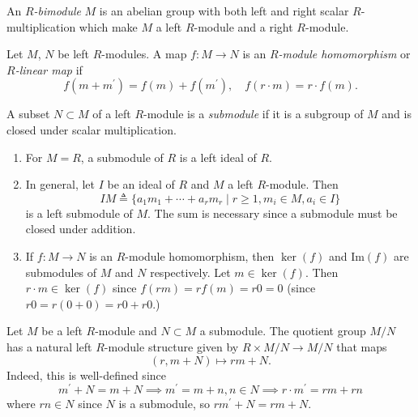 \begin{defn}[Bimodule]
An \emph{$R$-bimodule} $M$ is an abelian group with both left and
right scalar $R$-multiplication which make $M$ a left $R$-module and a
right $R$-module.
\end{defn}

\begin{defn}
Let $M$, $N$ be left $R$-modules. A map
$f : M \to N$ is an \emph{$R$-module homomorphism} or
\emph{$R$-linear map} if
$$
f(m + m^\prime) = f(m) + f(m^\prime), \quad
f(r \cdot m) = r \cdot f(m).
$$
\end{defn}

\begin{defn}[Submodule]
A subset $N \subset M$ of a left $R$-module is a \emph{submodule} if
it is a subgroup of $M$ and is closed under scalar multiplication.
\end{defn}

\begin{xmpl}
  \begin{enumerate}
    \item{
      For $M = R$, a submodule of $R$ is a left ideal of $R$.
    }
    \item{
      In general,
      let $I$ be an ideal of $R$ and $M$ a left $R$-module. Then
      $$
      IM \triangleq
      \{
        a_1 m_1 + \cdots + a_r m_r
      \mid
        r \geq  1, m_i \in M, a_i \in I
      \}
      $$
      is a left submodule of $M$. The sum is necessary since a submodule
      must be closed under addition.
    }
    \item{
      If $f : M \to N$ is an $R$-module homomorphism, then $\ker(f)$ and
      $\mathrm{Im}(f)$ are submodules of $M$ and $N$ respectively.
      Let $m \in \ker(f)$. Then $r \cdot m \in \ker(f)$ since
      $f(r m) = r f(m) = r0 = 0$ (since $r0 = r(0 + 0) = r0 + r0$.)
    }
  \end{enumerate}
\end{xmpl}

\begin{defn}[Quotient]
Let $M$ be a left $R$-module and $N \subset M$ a submodule. The
quotient group $M / N$ has a natural left $R$-module structure given
by $R \times M / N \to M / N$ that maps
$$
(r, m + N) \mapsto rm + N.
$$
Indeed, this is well-defined since
$$
m^\prime + N = m + N \implies
m^\prime = m + n, n \in N \implies
r \cdot m^\prime = r m + r n
$$
where $r n \in N$ since $N$ is a submodule, so
$rm^\prime + N = rm + N$.
\end{defn}

